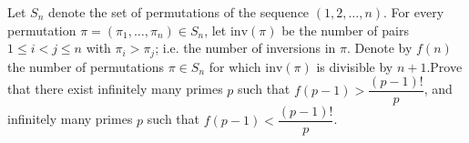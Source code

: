 \documentclass{article}
\begin{document}
\setlength{\parindent}{0pt}
Let $S_n$ denote the set of permutations of the sequence $(1,2,\dots,n)$. For every permutation $\pi=(\pi_1,\dots,\pi_n)\in S_n$, let $\mathrm{inv}(\pi)$ be the number of pairs $1\le i<j\le n$ with $\pi_i>\pi_j$; i.e. the number of inversions in $\pi$. Denote by $f(n)$ the number of permutations $\pi\in S_n$ for which $\mathrm{inv}(\pi)$ is divisible by $n+1$.\newline Prove that there exist infinitely many primes $p$ such that $f(p-1)>\dfrac{(p-1)!}p$, and infinitely many primes $p$ such that $f(p-1)<\dfrac{(p-1)!}p$.
\end{document}
